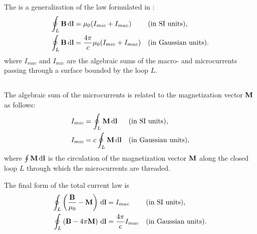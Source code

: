\subsection{}\label{26.4.2} The  is a generalization of the law formulated in :
\begin{align*}%
\oint_{L} \vb{B} \, \dd \vb{l} & =  \mu_{0} (I_{mic} + I_{mac}) && \text{(in SI units),} \\
\oint_{L} \vb{B} \, \dd \vb{l} & = \frac{4\pi}{c} \mu_{0} (I_{mic} + I_{mac}) && \text{(in Gaussian units)}.
\end{align*}
where $I_{mac}$ and $I_{mic}$ are the algebraic sums of the macro- and microcurrents passing through a surface bounded by the loop $L$. 

\subsection{}\label{26.4.3} The algebraic sum of the microcurrents is related to the magnetization vector $\vb{M}$ as follows:
\begin{align*}%
I_{mic} & =  \oint_{L} \vb{M} \, \dd \vb{l} && \text{(in SI units),} \\
I_{mic} & =  c \oint_{L} \vb{M} \, \dd \vb{l} && \text{(in Gaussian units)},
\end{align*}
where $\oint \vb{M} \, \dd \vb{l}$ is the circulation of the magnetization vector $\vb{M}$  along the closed loop $L$ through which the microcurrents are threaded.

The final form of the total current law  is
\begin{align*}%
\oint_{L} \left(\frac{\vb{B}}{\mu_{0}} - \vb{M} \right) \, \dd \vb{l} & =  I_{mac} && \text{(in SI units),} \\
\oint_{L} \left(\vb{B} - 4\pi \vb{M} \right) \, \dd \vb{l} & =  \frac{4\pi}{c} I_{mac} && \text{(in Gaussian units)}.
\end{align*}

\subsection{}\label{26.4.4}

